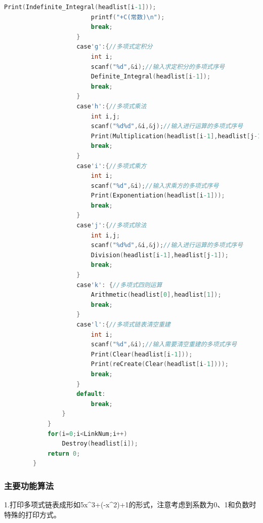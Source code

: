 \documentclass{ctexart}
\begin{document}
\begin{lstlisting}[language=C, caption=程序结构]
						Print(Indefinite_Integral(headlist[i-1]));
						printf("+C(常数)\n");
						break;
					}
					case'g':{//多项式定积分
						int i;
						scanf("%d",&i);//输入求定积分的多项式序号
						Definite_Integral(headlist[i-1]);
						break;
					}
					case'h':{//多项式乘法
						int i,j;
						scanf("%d%d",&i,&j);//输入进行运算的多项式序号
						Print(Multiplication(headlist[i-1],headlist[j-1]));
						break;
					}
					case'i':{//多项式乘方
						int i;
						scanf("%d",&i);//输入求乘方的多项式序号
						Print(Exponentiation(headlist[i-1]));
						break;
					}
					case'j':{//多项式除法
						int i,j;
						scanf("%d%d",&i,&j);//输入进行运算的多项式序号
						Division(headlist[i-1],headlist[j-1]);
						break;
					}
					case'k': {//多项式四则运算
						Arithmetic(headlist[0],headlist[1]);
						break;
					}
					case'l':{//多项式链表清空重建
						int i;
						scanf("%d",&i);//输入需要清空重建的多项式序号
						Print(Clear(headlist[i-1]));
						Print(reCreate(Clear(headlist[i-1])));
						break;
					}
					default:
						break;
				}
			}
			for(i=0;i<LinkNum;i++)
				Destroy(headlist[i]);
			return 0;
		}
	\end{lstlisting}
	\subsubsection{主要功能算法}
	1.打印多项式链表成形如5x\^{}3+(-x\^{}2)+1的形式，注意考虑到系数为0、1和负数时特殊的打印方式。
\end{document}
